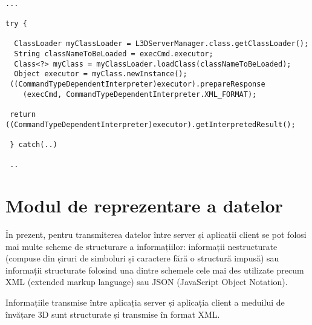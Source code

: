 \begin{verbatim}

...

try {

  ClassLoader myClassLoader = L3DServerManager.class.getClassLoader();
  String classNameToBeLoaded = execCmd.executor;
  Class<?> myClass = myClassLoader.loadClass(classNameToBeLoaded);
  Object executor = myClass.newInstance();
 ((CommandTypeDependentInterpreter)executor).prepareResponse 
 	(execCmd, CommandTypeDependentInterpreter.XML_FORMAT);
 
 return ((CommandTypeDependentInterpreter)executor).getInterpretedResult();
 
 } catch(..)
 
 ..
\end{verbatim}

\section{Modul de reprezentare a datelor}
\par În prezent, pentru transmiterea datelor între server și aplicații client se pot folosi mai multe scheme de structurare a informațiilor: informații nestructurate (compuse din șiruri de simboluri și caractere fără o structură impusă) sau informații structurate folosind una dintre schemele cele mai des utilizate precum XML (extended markup language) sau JSON (JavaScript Object Notation).
\par Informațiile transmise între aplicația server și aplicația client a meduilui de învățare 3D sunt structurate și transmise în format XML.
